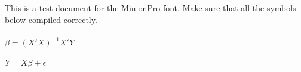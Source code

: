 \documentclass{article}
\begin{document}
This is a test document for the MinionPro font. Make sure that all the
symbols below compiled correctly.
\\
\\
$\beta = (X'X)^{-1} X'Y$
\\
\\
$Y = X\beta + \epsilon$
\end{document}
